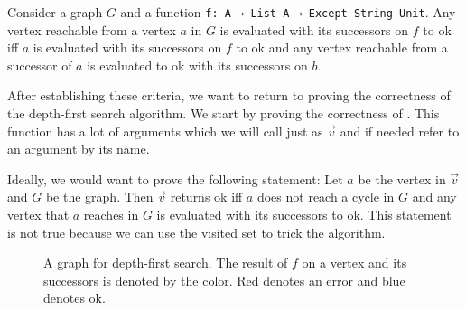 \begin{lemma}[\canReachLemma]
  Consider a graph $G$ and a function \lstinline|f: A → List A → Except String Unit|.
  Any vertex reachable from a vertex $a$ in $G$ is evaluated with its successors on $f$ to ok iff $a$ is evaluated with its successors on $f$ to ok and any vertex reachable from a successor of $a$ is evaluated to ok with its successors on $b$.
\end{lemma}

After establishing these criteria, we want to return to proving the correctness of the depth-first search algorithm. We start by proving the correctness of \dfsstep. This function has a lot of arguments which we will call just as $\vec{v}$ and if needed refer to an argument by its name.

Ideally, we would want to prove the following statement: Let $a$ be the vertex in $\vec{v}$ and $G$ be the graph. Then \dfsstep $\vec{v}$ returns ok iff $a$ does not reach a cycle in $G$ and any vertex that $a$ reaches in $G$ is evaluated with its successors to ok. This statement is not true because we can use the visited set to trick the algorithm.

\begin{figure}
  \centering
  \caption{A graph for depth-first search. The result of $f$ on a vertex and its successors is denoted by the color. Red denotes an error and blue denotes ok.}
  \label{fig:dfsSetProblem}
\end{figure}

